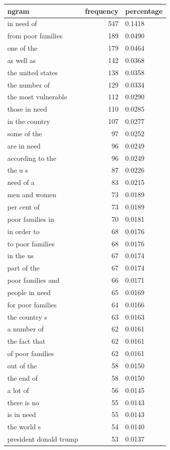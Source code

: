 \begin{tabular}{lrl}
\toprule
ngram & frequency & percentage \\
\midrule
in need of & 547 & 0.1418 \\
from poor families & 189 & 0.0490 \\
one of the & 179 & 0.0464 \\
as well as & 142 & 0.0368 \\
the united states & 138 & 0.0358 \\
the number of & 129 & 0.0334 \\
the most vulnerable & 112 & 0.0290 \\
those in need & 110 & 0.0285 \\
in the country & 107 & 0.0277 \\
some of the & 97 & 0.0252 \\
are in need & 96 & 0.0249 \\
according to the & 96 & 0.0249 \\
the u s & 87 & 0.0226 \\
need of a & 83 & 0.0215 \\
men and women & 73 & 0.0189 \\
per cent of & 73 & 0.0189 \\
poor families in & 70 & 0.0181 \\
in order to & 68 & 0.0176 \\
to poor families & 68 & 0.0176 \\
in the us & 67 & 0.0174 \\
part of the & 67 & 0.0174 \\
poor families and & 66 & 0.0171 \\
people in need & 65 & 0.0169 \\
for poor families & 64 & 0.0166 \\
the country s & 63 & 0.0163 \\
a number of & 62 & 0.0161 \\
the fact that & 62 & 0.0161 \\
of poor families & 62 & 0.0161 \\
out of the & 58 & 0.0150 \\
the end of & 58 & 0.0150 \\
a lot of & 56 & 0.0145 \\
there is no & 55 & 0.0143 \\
is in need & 55 & 0.0143 \\
the world s & 54 & 0.0140 \\
president donald trump & 53 & 0.0137 \\

\end{tabular}
